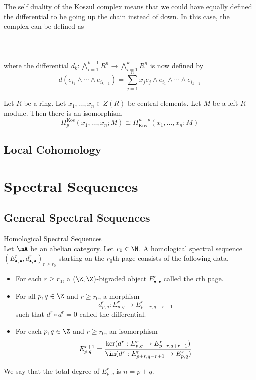 \documentclass[a4paper]{article}
\begin{document}
The self duality of the Koszul complex means that we could have equally defined the differential to be going up the chain instead of down. In this case, the complex can be defined as \\~\\
\\~\\
where the differential $d_k:\bigwedge_{i=1}^{k-1}R^n\to\bigwedge_{i=1}^kR^n$ is now defined by $$d(e_{i_1}\wedge\cdots\wedge e_{i_{k-1}})=\sum_{j=1}^nx_je_j\wedge e_{i_1}\wedge\cdots\wedge e_{i_{k-1}}$$

\begin{crl}{}{} Let $R$ be a ring. Let $x_1,\dots,x_n\in Z(R)$ be central elements. Let $M$ be a left $R$-module. Then there is an isomorphism $$H_p^\text{Kos}(x_1,\dots,x_n;M)\cong H_{\text{Kos}}^{n-p}(x_1,\dots,x_n;M)$$
\end{crl}

\subsection{Local Cohomology}

\pagebreak
\section{Spectral Sequences}
\subsection{General Spectral Sequences}
\begin{defn}{Homological Spectral Sequences}{}\\
Let $\mA$ be an abelian category. Let $r_0\in\N$. A homological spectral sequence $(E_{\bullet,\bullet}^r,d_{\bullet,\bullet}^r)_{r\geq r_0}$ starting on the $r_0$th page consists of the following data.  
\begin{itemize}
\item For each $r\geq r_0$, a $(\Z,\Z)$-bigraded object $E_{\bullet,\bullet}^r$ called the $r$th page. 
\item For all $p,q\in\Z$ and $r\geq r_0$, a morphism $$d_{p,q}^r:E_{p,q}^r\to E_{p-r,q+r-1}^r$$ such that $d^r\circ d^r=0$ called the differential. 
\item For each $p,q\in\Z$ and $r\geq r_0$, an isomorphism $$E_{p,q}^{r+1}=\frac{\ker(d^r:E_{p,q}^r\to E_{p-r,q+r-1}^r)}{\im(d^r:E_{p+r,q-r+1}^r\to E_{p,q}^r)}$$
\end{itemize}
We say that the total degree of $E_{p,q}^r$ is $n=p+q$. 
\end{defn}
\end{document}
